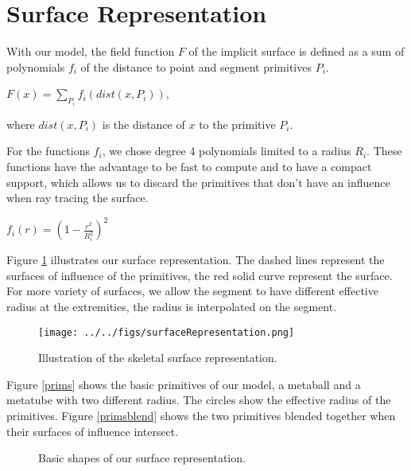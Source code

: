 \documentclass[annual]{acmsiggraph}
\begin{document}
\section{Surface Representation}

With our model, the field function $F$ of the implicit surface is defined as a sum of polynomials $f_i$ of the distance to point and segment primitives $P_i$.

\begin{center}
$F(x) = \displaystyle\sum\limits_{P_i} f_i(dist(x,P_i))$,
\end{center}
where $dist(x,P_i)$ is the distance of $x$ to the primitive $P_i$.

For the functions $f_i$, we chose degree 4 polynomials limited to a radius $R_i$.
These functions have the advantage to be fast to compute and to have a compact support, which allows us to discard the primitives that don't have an influence when ray tracing the surface.

\begin{center}
$f_i(r) = \left( 1 - \frac{r^2}{R_i^2} \right)^2$ 
\end{center}

Figure \ref{surfrep} illustrates our surface representation. The dashed lines represent the surfaces of influence of the primitives, the red solid curve represent the surface.
For more variety of surfaces, we allow the segment to have different effective radius at the extremities, the radius is interpolated on the segment.



\begin{figure}[ht]
  \centering
  \texttt{[image: ../../figs/surfaceRepresentation.png]}
  \caption{Illustration of the skeletal surface representation.}
  \label{surfrep}
\end{figure}

Figure \ref{prims} shows the basic primitives of our model, a metaball and a metatube with two different radius. The circles show the effective radius of the primitives.
Figure \ref{primsblend} shows the two primitives blended together when their surfaces of influence intersect.

\begin{figure}[ht]
  \centering

  \caption{Basic shapes of our surface representation.}
 \end{figure}
\end{document}
